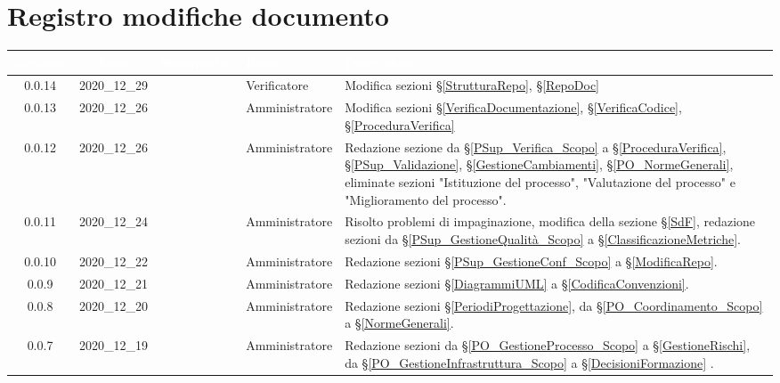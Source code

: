 \section*{Registro modifiche documento}
{
\renewcommand{\arraystretch}{1.5}
\centering
\begin{longtable}{ c c  C{2.3cm} C{3cm} C{3.2cm}}


 \textcolor{white}{\textbf{Versione}}&
    \textcolor{white}{\textbf{Data}}&
    \textcolor{white}{\textbf{Nominativo}}&
    \textcolor{white}{\textbf{Ruolo}}&
    \textcolor{white}{\textbf{Descrizione}}\\	
    \endhead
    
    0.0.14 & 2020\_12\_29 & \BL{} & Verificatore & Modifica sezioni \S\ref{StrutturaRepo}, \S\ref{RepoDoc} \\
    
    0.0.13 & 2020\_12\_26 & \TG{}  & Amministratore & Modifica sezioni \S\ref{VerificaDocumentazione}, \S\ref{VerificaCodice}, \S\ref{ProceduraVerifica} \\
    
      0.0.12 & 2020\_12\_26 & \TG{}  & Amministratore & Redazione sezione da \S\ref{PSup_Verifica_Scopo} a \S\ref{ProceduraVerifica}, \S\ref{PSup_Validazione}, \S\ref{GestioneCambiamenti}, \S\ref{PO_NormeGenerali}, eliminate sezioni "Istituzione del processo", "Valutazione del processo" e "Miglioramento del processo". \\
    
     0.0.11 & 2020\_12\_24 & \TG{}  & Amministratore & Risolto problemi di impaginazione, modifica della sezione \S\ref{SdF}, redazione sezioni da \S\ref{PSup_GestioneQualità_Scopo} a \S\ref{ClassificazioneMetriche}. \\
    
     0.0.10 & 2020\_12\_22 & \TG{}  & Amministratore & Redazione sezioni \S\ref{PSup_GestioneConf_Scopo} a \S\ref{ModificaRepo}. \\
    
    0.0.9 & 2020\_12\_21 & \TG{}  & Amministratore & Redazione sezioni \S\ref{DiagrammiUML} a \S\ref{CodificaConvenzioni}. \\
    
    0.0.8 & 2020\_12\_20 & \TG{}  & Amministratore & Redazione sezioni \S\ref{PeriodiProgettazione}, da \S\ref{PO_Coordinamento_Scopo} a \S\ref{NormeGenerali}. \\
    
     0.0.7 & 2020\_12\_19 & \TG{}  & Amministratore & Redazione sezioni da \S\ref{PO_GestioneProcesso_Scopo} a \S\ref{GestioneRischi}, da \S\ref{PO_GestioneInfrastruttura_Scopo} a \S\ref{DecisioniFormazione} . \\
    

\end{longtable}}
